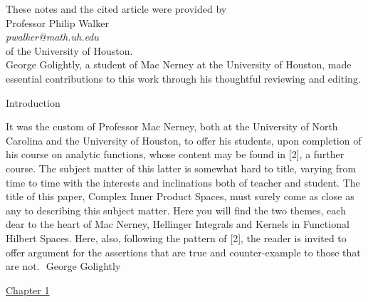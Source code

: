 \vspace{3in}
\begin{center}
 These notes and the cited article were provided by \\  Professor Philip Walker \\  \emph{pwalker@math.uh.edu} \\ of the University of Houston. \\
\vspace{0.5in}
George Golightly, a student of Mac Nerney at the University of Houston, made essential contributions to this work through his thoughtful reviewing and editing.

\end{center}





\np
\begin{center}
\begin{large}
Introduction
\end{large}
\end{center}

It was the custom of Professor Mac Nerney, both at the University of North Carolina
and the University of Houston,  to offer his students, upon completion of his course on
analytic functions,  whose content may be found in [2], a further course.  The subject matter of this latter is somewhat hard to title, varying from time to time with the interests and inclinations both of teacher and student.  The title of this paper,  Complex Inner Product Spaces, must surely come as close as any to describing this subject matter.
Here you will find the two themes, each dear to the heart of Mac Nerney,  Hellinger Integrals  and Kernels in Functional Hilbert Spaces.  Here, also, following the pattern of [2],  the reader is invited to offer argument for the assertions that are true and counter-example to those that are not. \nl
$ $\nl
$ $\indent \indent \indent \indent \indent \indent \indent \indent \indent \indent George Golightly
\np
\begin{center}
\underline{Chapter 1}
\end{center}

